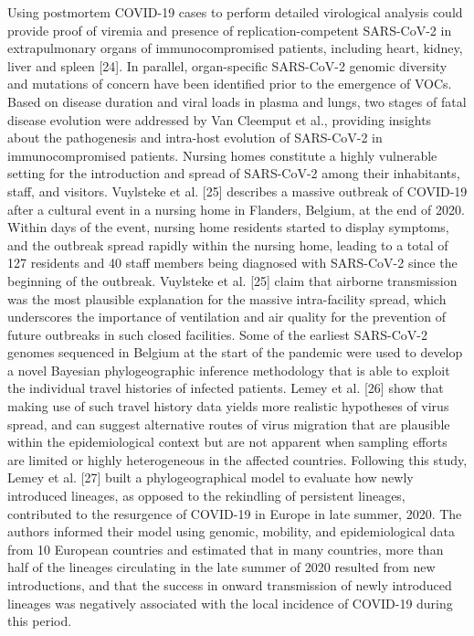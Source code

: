 Using postmortem COVID-19 cases to perform detailed virological analysis could provide proof of viremia and presence of replication-competent SARS-CoV-2 in extrapulmonary organs of immunocompromised patients, including heart, kidney, liver and spleen [24]. In parallel, organ-specific SARS-CoV-2 genomic diversity and mutations of concern have been identified prior to the emergence of VOCs. Based on disease duration and viral loads in plasma and lungs, two stages of fatal disease evolution were addressed by Van Cleemput et al., providing insights about the pathogenesis and intra-host evolution of SARS-CoV-2 in immunocompromised patients.
Nursing homes constitute a highly vulnerable setting for the introduction and spread of SARS-CoV-2 among their inhabitants, staff, and visitors. Vuylsteke et al. [25] describes a massive outbreak of COVID-19 after a cultural event in a nursing home in Flanders, Belgium, at the end of 2020. Within days of the event, nursing home residents started to display symptoms, and the outbreak spread rapidly within the nursing home, leading to a total of 127 residents and 40 staff members being diagnosed with SARS-CoV-2 since the beginning of the outbreak. Vuylsteke et al. [25] claim that airborne transmission was the most plausible explanation for the massive intra-facility spread, which underscores the importance of ventilation and air quality for the prevention of future outbreaks in such closed facilities.
Some of the earliest SARS-CoV-2 genomes sequenced in Belgium at the start of the pandemic were used to develop a novel Bayesian phylogeographic inference methodology that is able to exploit the individual travel histories of infected patients. Lemey et al. [26] show that making use of such travel history data yields more realistic hypotheses of virus spread, and can suggest alternative routes of virus migration that are plausible within the epidemiological context but are not apparent when sampling efforts are limited or highly heterogeneous in the affected countries.
Following this study, Lemey et al. [27] built a phylogeographical model to evaluate how newly introduced lineages, as opposed to the rekindling of persistent lineages, contributed to the resurgence of COVID-19 in Europe in late summer, 2020. The authors informed their model using genomic, mobility, and epidemiological data from 10 European countries and estimated that in many countries, more than half of the lineages circulating in the late summer of 2020 resulted from new introductions, and that the success in onward transmission of newly introduced lineages was negatively associated with the local incidence of COVID-19 during this period.
